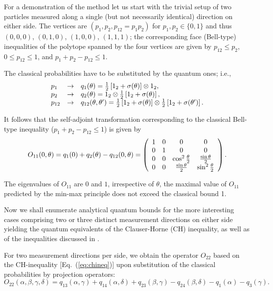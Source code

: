 \documentclass[pra,amsmath,amsfonts,showkeys,showpacs,preprint]{revtex4}
\begin{document}
For a demonstration of the method let us start with the trivial setup
of two particles measured along a single (but not necessarily
identical) direction on either side.
The vertices are $(p_1,p_2,p_{12}=p_1p_2)$ for $p_1, p_2 \in \{0,1\}$ and thus
$(0,  0,  0)$,
$(0,  1,  0)$,
$(1,  0,  0)$,
$(1,  1,  1)$;
the corresponding face (Bell-type) inequalities of the polytope spanned by the four vertices
are given by
$p_{12} \le p_2$,
$0\le p_{12}\le 1$, and $p_1+p_2-p_{12}\le 1$.

The classical probabilities have to be substituted by the quantum ones;
i.e.,
\begin{equation}
\begin{array}{lll}
p_1 &\rightarrow& q_1 (\theta ) =
{\frac{1}{2}}\left[1_2 + {\bf \sigma}( \theta )\right] \otimes 1_2,
\\
p_2 &\rightarrow& q_2 (\theta ) =
1_2 \otimes {\frac{1}{2}}\left[1_2 + {\bf \sigma}( \theta )\right],
\\
p_{12}&\rightarrow& q_{12} (\theta ,\theta ') =
{\frac{1}{2}}\left[1_2 + {\bf \sigma}( \theta )\right]
\otimes
{\frac{1}{2}}\left[1_2 + {\bf \sigma}( \theta ')\right].
\end{array}
\label{2004-qbounds-e2}
\end{equation}

It follows that the self-adjoint transformation corresponding to the classical Bell-type inequality
($p_1+p_2-p_{12}\le 1$) is given by
\begin{equation}
O_{11}(0,\theta) = q_1(0)+q_2(\theta)-q_{12} (0, \theta )
=\left(
\begin{array}{cccccccc}
   1 & 0 & 0 & 0 \cr 0 & 1 & 0 & 0 \cr 0 & 0 & {\cos^2
     \frac{\theta }{2}} & \frac{\sin \theta }
   {2} \cr 0 & 0 & \frac{\sin \theta }{2} & {\sin^2  \frac{\theta
     }{2}} \cr
 \end{array}\right).
\end{equation}

The eigenvalues of $O_{11}$ are $0$ and $1$, irrespective of $\theta$,
the maximal value of $O_{11}$ predicted by the min-max principle
 does not exceed the classical bound 1.

Now we shall enumerate analytical quantum bounds
for the more interesting cases comprising two or three distinct
measurement directions on either side yielding the
quantum equivalents of the Clauser-Horne (CH) inequality, as well as
of the inequalities discussed in \cite{pitowsky01,collins-gisin03,sliwa03}.

For two measurement directions per side,
we obtain the operator $O_{22}$ based on the CH-inequality [Eq.~(\ref{eq:chineq})]
upon substitution of the classical
 probabilities by projection operators:
\begin{equation}
O_{22}(\alpha,\beta,\gamma,\delta)=  q_{13}(\alpha,\gamma) +
q_{14}(\alpha,\delta) + q_{23}(\beta,\gamma) \nonumber - q_{24}(\beta,\delta)- q_{1}(\alpha) - q_{3}(\gamma).
\label{2004-qbounds-e4}
\end{equation}
\end{document}
